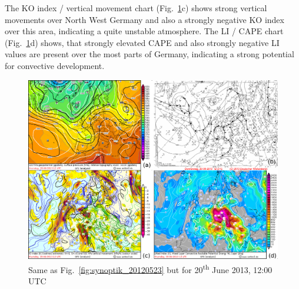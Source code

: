 The KO index / vertical movement chart (Fig.~\ref{fig:synoptik_20130620}c) shows strong vertical movements over North West Germany and also a strongly negative KO index over this area, indicating a quite unstable atmosphere. The LI / CAPE chart (Fig.~\ref{fig:synoptik_20130620}d) shows, that strongly elevated CAPE and also strongly negative LI values are present over the most parts of Germany, indicating a strong potential for convective development.

\begin{figure}[htbp]
	\centering
	\includegraphics[width=0.8\linewidth]{Grafiken/Abbildungen/synoptik_20130620.png}
	\caption{Same as Fig.~\ref{fig:synoptik_20120523} but for 20\textsuperscript{th} June 2013, 12:00 UTC}
    \label{fig:synoptik_20130620}  
\end{figure}